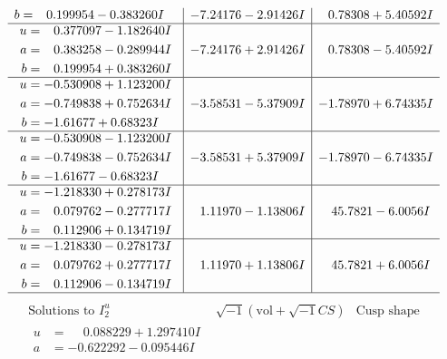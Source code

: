 \documentclass[1p]{elsarticle_modified}
\theoremstyle{definition}
\newcommand{\I}{\sqrt{-1}}
\begin{document}
$$\begin{array}{c|c|c}
\begin{aligned}
b &= \phantom{-}0.199954 - 0.383260 I\end{aligned}
 & -7.24176 - 2.91426 I & \phantom{-}0.78308 + 5.40592 I \\ \hline\begin{aligned}
u &= \phantom{-}0.377097 - 1.182640 I \\
a &= \phantom{-}0.383258 - 0.289944 I \\
b &= \phantom{-}0.199954 + 0.383260 I\end{aligned}
 & -7.24176 + 2.91426 I & \phantom{-}0.78308 - 5.40592 I \\ \hline\begin{aligned}
u &= -0.530908 + 1.123200 I \\
a &= -0.749838 + 0.752634 I \\
b &= -1.61677 + 0.68323 I\end{aligned}
 & -3.58531 - 5.37909 I & -1.78970 + 6.74335 I \\ \hline\begin{aligned}
u &= -0.530908 - 1.123200 I \\
a &= -0.749838 - 0.752634 I \\
b &= -1.61677 - 0.68323 I\end{aligned}
 & -3.58531 + 5.37909 I & -1.78970 - 6.74335 I \\ \hline\begin{aligned}
u &= -1.218330 + 0.278173 I \\
a &= \phantom{-}0.079762 - 0.277717 I \\
b &= \phantom{-}0.112906 + 0.134719 I\end{aligned}
 & \phantom{-}1.11970 - 1.13806 I & \phantom{-}45.7821 - 6.0056 I \\ \hline\begin{aligned}
u &= -1.218330 - 0.278173 I \\
a &= \phantom{-}0.079762 + 0.277717 I \\
b &= \phantom{-}0.112906 - 0.134719 I\end{aligned}
 & \phantom{-}1.11970 + 1.13806 I & \phantom{-}45.7821 + 6.0056 I\\
 \hline 
 \end{array}$$\newpage$$\begin{array}{c|c|c}  
\text{Solutions to }I^u_{2}& \I (\text{vol} + \sqrt{-1}CS) & \text{Cusp shape}\\
 \hline 
\begin{aligned}
u &= \phantom{-}0.088229 + 1.297410 I \\
a &= -0.622292 - 0.095446 I \\

\end{aligned}
\end{array}$$
\end{document}
